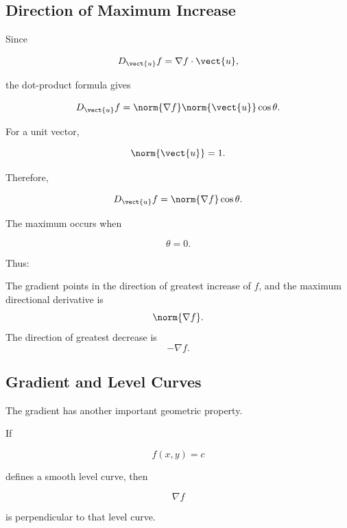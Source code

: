 \subsection{Direction of Maximum Increase}
\label{subsec:maximum-increase-gradient}

Since

\[ D_{\vect{u}}f=\nabla f\cdot\vect{u}, \]

the dot-product formula gives

\[ D_{\vect{u}}f
=
\norm{\nabla f}\norm{\vect{u}}\cos\theta. \]

For a unit vector,

\[ \norm{\vect{u}}=1. \]

Therefore,

\[ D_{\vect{u}}f=\norm{\nabla f}\cos\theta. \]

The maximum occurs when

\[ \theta=0. \]

Thus:

\begin{importantbox}
The gradient points in the direction of greatest increase of \(f\), and the
maximum directional derivative is
\[ \norm{\nabla f}. \]
The direction of greatest decrease is
\[ -\nabla f. \]
\end{importantbox}

\subsection{Gradient and Level Curves}
\label{subsec:gradient-level-curves}

The gradient has another important geometric property.

If

\[ f(x,y)=c \]

defines a smooth level curve, then

\[ \nabla f \]

is perpendicular to that level curve.

\begin{center}
\end{center}

